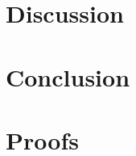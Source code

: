 \documentclass[a4paper]{report}
\theoremstyle{plain}
\begin{document}
\chapter{Discussion}


\clearpage
\chapter{Conclusion}

\clearpage


\clearpage
\appendix
{}
\chapter{Proofs}

\end{document}
